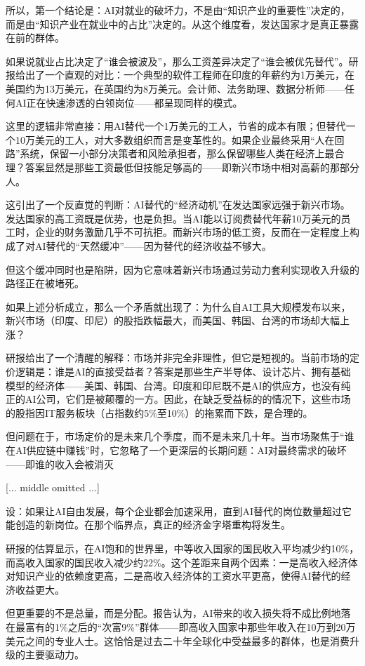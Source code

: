 \documentclass[11pt]{ctexart}
\begin{document}
所以，第一个结论是：AI对就业的破坏力，不是由“知识产业的重要性”决定的，而是由“知识产业在就业中的占比”决定的。从这个维度看，发达国家才是真正暴露在前的群体。

如果说就业占比决定了“谁会被波及”，那么工资差异决定了“谁会被优先替代”。研报给出了一个直观的对比：一个典型的软件工程师在印度的年薪约为1万美元，在美国约为13万美元，在英国约为8万美元。会计师、法务助理、数据分析师——任何AI正在快速渗透的白领岗位——都呈现同样的模式。

这里的逻辑非常直接：用AI替代一个1万美元的工人，节省的成本有限；但替代一个10万美元的工人，对大多数组织而言是变革性的。如果企业最终采用“人在回路”系统，保留一小部分决策者和风险承担者，那么保留哪些人类在经济上最合理？答案显然是那些工资最低但技能足够高的——即新兴市场中相对高薪的那部分人。

这引出了一个反直觉的判断：AI替代的“经济动机”在发达国家远强于新兴市场。发达国家的高工资既是优势，也是负担。当AI能以订阅费替代年薪10万美元的员工时，企业的财务激励几乎不可抗拒。而新兴市场的低工资，反而在一定程度上构成了对AI替代的“天然缓冲”——因为替代的经济收益不够大。

但这个缓冲同时也是陷阱，因为它意味着新兴市场通过劳动力套利实现收入升级的路径正在被堵死。

如果上述分析成立，那么一个矛盾就出现了：为什么自AI工具大规模发布以来，新兴市场（印度、印尼）的股指跌幅最大，而美国、韩国、台湾的市场却大幅上涨？

研报给出了一个清醒的解释：市场并非完全非理性，但它是短视的。当前市场的定价逻辑是：谁是AI的直接受益者？答案是那些生产半导体、设计芯片、拥有基础模型的经济体——美国、韩国、台湾。印度和印尼既不是AI的供应方，也没有纯正的AI公司，它们是被颠覆的一方。因此，在缺乏受益标的的情况下，这些市场的股指因IT服务板块（占指数约5\%至10\%）的拖累而下跌，是合理的。

但问题在于，市场定价的是未来几个季度，而不是未来几十年。当市场聚焦于“谁在AI供应链中赚钱”时，它忽略了一个更深层的长期问题：AI对最终需求的破坏——即谁的收入会被消灭

[... middle omitted ...]

设：如果让AI自由发展，每个企业都会加速采用，直到AI替代的岗位数量超过它能创造的新岗位。在那个临界点，真正的经济金字塔重构将发生。

研报的估算显示，在AI饱和的世界里，中等收入国家的国民收入平均减少约10\%，而高收入国家的国民收入减少约22\%。这个差距来自两个因素：一是高收入经济体对知识产业的依赖度更高，二是高收入经济体的工资水平更高，使得AI替代的经济收益更大。

但更重要的不是总量，而是分配。报告认为，AI带来的收入损失将不成比例地落在最富有的1\%之后的“次富9\%”群体——即高收入国家中那些年收入在10万到20万美元之间的专业人士。这恰恰是过去二十年全球化中受益最多的群体，也是消费升级的主要驱动力。
\end{document}
